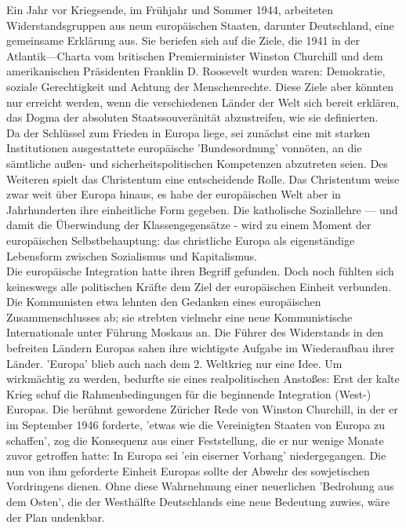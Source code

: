 \documentclass[letterpaper, 12pt]{article}
\begin{document}
Ein Jahr vor
Kriegsende, im Frühjahr und Sommer 1944, arbeiteten Widerstandsgruppen aus neun europäischen Staaten, darunter
Deutschland, eine gemeinsame Erklärung aus. Sie beriefen sieh
auf die Ziele, die 1941 in der Atlantik—Charta vom britischen
Premierminister Winston Churchill und dem amerikanischen
Präsidenten Franklin D. Roosevelt wurden waren: Demokratie, soziale Gerechtigkeit und Achtung der Menschenrechte. Diese Ziele aber könnten nur erreicht werden, wenn die verschiedenen Länder der Welt sich bereit erklären, das Dogma der absoluten Staatssouveränität abzustreifen, wie sie definierten. \\
Da der Schlüssel zum Frieden in Europa liege, sei zunächst eine mit starken Institutionen ausgestattete europäische 'Bundesordnung' vonnöten, an die sämtliche außen- und sicherheitspolitischen Kompetenzen abzutreten seien. Des Weiteren spielt das Christentum eine entscheidende Rolle. Das Christentum weise zwar weit über Europa hinaus, es habe der europäischen Welt aber in Jahrhunderten ihre einheitliche Form gegeben. Die katholische Soziallehre — und damit die Überwindung der Klassengegensätze - wird zu einem Moment der europäischen Selbstbehauptung: das christliche Europa als eigenständige Lebensform zwischen Sozialismus und Kapitalismus. \\
Die europäische Integration hatte ihren Begriff gefunden.
Doch noch fühlten sich keineswegs alle politischen Kräfte dem Ziel der europäischen Einheit verbunden. Die Kommunisten etwa lehnten den Gedanken eines europäischen Zusammenschlusses ab; sie strebten vielmehr eine neue Kommunistische Internationale unter Führung Moskaus an. Die Führer des Widerstands in den befreiten Ländern Europas sahen ihre wichtigste Aufgabe im Wiederaufbau ihrer Länder. 'Europa' blieb auch nach dem 2. Weltkrieg nur eine Idee. Um wirkmächtig zu werden, bedurfte sie eines realpolitischen Anstoßes: Erst der kalte Krieg schuf die Rahmenbedingungen für die beginnende Integration (West-) Europas. Die berühmt gewordene Züricher Rede von Winston Churchill, in der er im September 1946 forderte, 'etwas wie die Vereinigten Staaten von Europa zu schaffen', zog die Konsequenz aus einer Feststellung, die er nur wenige Monate zuvor getroffen hatte: In Europa sei 'ein eiserner Vorhang' niedergegangen. Die nun von ihm geforderte Einheit Europas sollte der Abwehr des sowjetischen Vordringens dienen. Ohne diese Wahrnehmung einer neuerlichen 'Bedrohung aus dem Osten', die der Westhälfte Deutschlands eine neue Bedeutung zuwies, wäre der Plan undenkbar.

\clearpage


\end{document}
